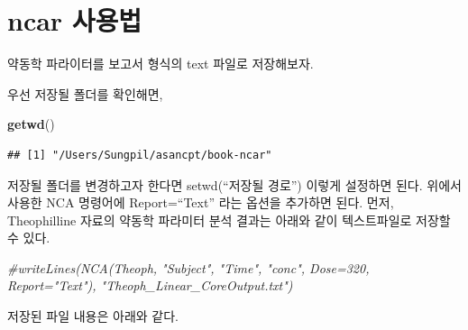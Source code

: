 \documentclass[12pt,]{krantz}
\newenvironment{Shaded}{\begin{snugshade}}{\end{snugshade}}
\newcommand{\KeywordTok}[1]{\textcolor[rgb]{0.13,0.29,0.53}{\textbf{#1}}}
\newcommand{\CommentTok}[1]{\textcolor[rgb]{0.56,0.35,0.01}{\textit{#1}}}
\newcommand{\NormalTok}[1]{#1}
\theoremstyle{definition}
\theoremstyle{definition}
\theoremstyle{definition}
\theoremstyle{remark}
\begin{document}
\section{ncar 사용법}\label{ncar-}

약동학 파라이터를 보고서 형식의 text 파일로 저장해보자.

우선 저장될 폴더를 확인해면,

\begin{Shaded}
\begin{Highlighting}[]
\KeywordTok{getwd}\NormalTok{()}
\end{Highlighting}
\end{Shaded}

\begin{verbatim}
## [1] "/Users/Sungpil/asancpt/book-ncar"
\end{verbatim}

저장될 폴더를 변경하고자 한다면 setwd(``저장될 경로'') 이렇게 설정하면
된다. 위에서 사용한 NCA 명령어에 Report=``Text'' 라는 옵션을 추가하면
된다. 먼저, Theophilline 자료의 약동학 파라미터 분석 결과는 아래와 같이
텍스트파일로 저장할 수 있다.

\begin{Shaded}
\begin{Highlighting}[]
\CommentTok{#writeLines(NCA(Theoph, "Subject", "Time", "conc", Dose=320, Report="Text"), "Theoph_Linear_CoreOutput.txt")}
\end{Highlighting}
\end{Shaded}

저장된 파일 내용은 아래와 같다.
\end{document}
